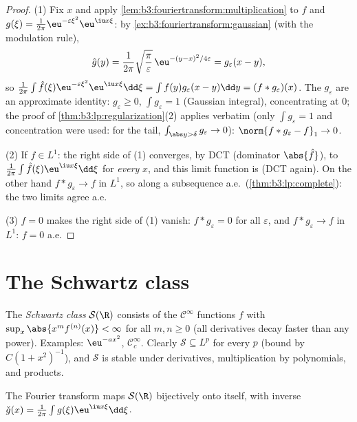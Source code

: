 \begin{proof}
(1) Fix $x$ and apply
\cref{lem:b3:fouriertransform:multiplication} to $f$ and
$g(\xi) = \frac1{2\pi}\eu^{-\varepsilon\xi^2}\eu^{\iu x\xi}$:
by \cref{ex:b3:fouriertransform:gaussian} (with the modulation
rule),
\[
\hat g(y) = \frac1{2\pi}\sqrt{\frac\pi\varepsilon}\,
\eu^{-(y - x)^2/4\varepsilon} = g_\varepsilon(x - y),
\]
so $\frac1{2\pi}\int\hat f(\xi)\eu^{-\varepsilon\xi^2}
\eu^{\iu x\xi}\dd\xi = \int f(y)g_\varepsilon(x - y)\dd y =
(f*g_\varepsilon)(x)$. The $g_\varepsilon$ are an
approximate identity: $g_\varepsilon \geq 0$,
$\int g_\varepsilon = 1$ (Gaussian integral), concentrating at
$0$; the proof of \cref{thm:b3:lp:regularization}(2) applies
verbatim (only $\int g_\varepsilon = 1$ and concentration were
used: for the tail, $\int_{\abs y > \delta}g_\varepsilon \to
0$): $\norm{f * g_\varepsilon - f}_1 \to 0$.

(2) If $\hat f \in L^1$: the right side of (1) converges, by
DCT (dominator $\abs{\hat f}$), to $\frac1{2\pi}\int\hat
f(\xi)\eu^{\iu x\xi}\dd\xi$ for \emph{every} $x$, and this
limit function is  (DCT again). On the other hand $f
* g_\varepsilon \to f$ in $L^1$, so along a subsequence a.e.\
(\cref{thm:b3:lp:complete}): the two limits agree a.e.

(3) $\hat f = 0$ makes the right side of (1) vanish: $f *
g_\varepsilon = 0$ for all $\varepsilon$, and $f *
g_\varepsilon \to f$ in $L^1$: $f = 0$ a.e.
\end{proof}

\section{The Schwartz class}

\begin{definition}\label{def:b3:fouriertransform:schwartz}
The \emph{Schwartz class} $\mathcal
S(\R)$ consists of the $\mathcal C^\infty$ functions $f$ with
$\sup_x\abs{x^m f^{(n)}(x)} < \infty$ for all $m, n \geq 0$
(all derivatives decay faster than any power). Examples:
$\eu^{-ax^2}$, $\mathcal C_c^\infty$. Clearly $\mathcal S
\subseteq L^p$ for every $p$ (bound by $C(1 + x^2)^{-1}$), and
$\mathcal S$ is stable under derivatives, multiplication by
polynomials, and products.
\end{definition}

\begin{theorem}\label{thm:b3:fouriertransform:schwartz}
The Fourier transform maps $\mathcal S(\R)$ bijectively onto
itself, with inverse $\check g(x) = \frac1{2\pi}\int
g(\xi)\eu^{\iu x\xi}\dd\xi$.
\end{theorem}

